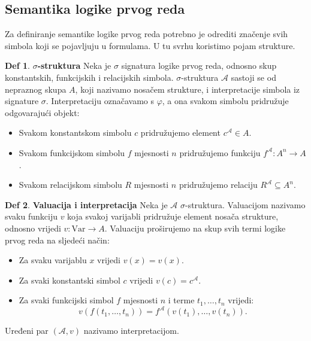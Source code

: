 \documentclass{article}
\theoremstyle{definition}
\newtheorem{definicija}{Def}[section]
\theoremstyle{plain}
\begin{document}
\subsection*{Semantika logike prvog reda}
Za definiranje semantike logike prvog reda potrebno je odrediti značenje svih simbola koji se pojavljuju u formulama. U tu svrhu koristimo pojam strukture.

\begin{definicija}\textbf{\(\sigma\)-struktura}\newline
Neka je \(\sigma\) signatura logike prvog reda, odnosno skup konstantskih, funkcijskih i relacijskih simbola. $\sigma$-struktura \(\mathcal A\) sastoji se od nepraznog skupa \(A\), koji nazivamo nosačem strukture, i interpretacije simbola iz signature \(\sigma\). Interpretaciju označavamo s \(\varphi\), a ona svakom simbolu pridružuje odgovarajući objekt:\begin{itemize}
    \item Svakom konstantskom simbolu \(c\) pridružujemo element \(c^{\mathcal A}\in A\).
    \item Svakom funkcijskom simbolu \(f\) mjesnosti \(n\) pridružujemo funkciju \(f^{\mathcal A}:A^n\rightarrow A\).
    \item Svakom relacijskom simbolu \(R\) mjesnosti \(n\) pridružujemo relaciju \(R^{\mathcal A}\subseteq A^n\).
\end{itemize}
\end{definicija}
\begin{definicija}\textbf{Valuacija i interpretacija}\newline
    Neka je \(\mathcal A\) $\sigma$-struktura. Valuacijom nazivamo svaku funkciju \(v\) koja svakoj varijabli pridružuje element nosača strukture, odnosno vrijedi \(v:\mathrm{Var}\rightarrow A\). Valuaciju proširujemo na skup svih termi logike prvog reda na sljedeći način:\begin{itemize}
        \item Za svaku varijablu \(x\) vrijedi \(v(x)=v(x)\).
        \item Za svaki konstantski simbol \(c\) vrijedi \(v(c)=c^{\mathcal A}\).
        \item Za svaki funkcijski simbol \(f\) mjesnosti \(n\) i terme \(t_1,\ldots,t_n\) vrijedi:
        \[
        v(f(t_1,\ldots,t_n))=
        f^{\mathcal A}(v(t_1),\ldots,v(t_n)).
        \]
    \end{itemize}
\end{definicija}
Uređeni par \((\mathcal A,v)\) nazivamo interpretacijom.
\end{document}
